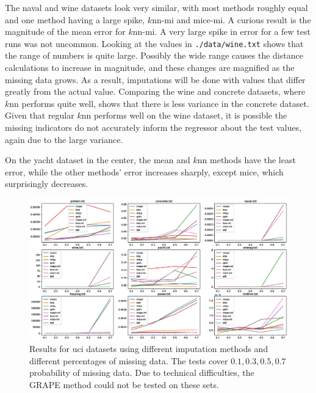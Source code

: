 \documentclass[12pt]{article}
\begin{document}
The naval and wine datasets look very similar, with most methods
roughly equal and one method having a large spike, $k$nn-mi and mice-mi.
A curious result is the magnitude of the mean error for $k$nn-mi.
A very large spike in error for a few test runs was not uncommon.
Looking at the values in \texttt{./data/wine.txt} shows that the range
of numbers is quite large.
Possibly the wide range causes the distance calculations
to increase in magnitude, and these changes are magnified as the missing 
data grows.
As a result, imputations will be done with values that differ greatly from the 
actual value.
Comparing the wine and concrete datasets, where $k$nn performs quite well,
shows that there is less variance in the concrete dataset.
Given that regular $k$nn performs well on the wine dataset, it is possible
the missing indicators do not accurately inform the regressor about the 
test values, again due to the large variance.

On the yacht dataset in the center, the mean and $k$nn methods have the least error,
while the other methods' error increases sharply, except mice, which surprisingly 
decreases.
\begin{figure}
	\centering
	\label{fig:results}
	\includegraphics[width=\linewidth]{results_std.eps}
	\caption{Results for uci datasets using different imputation methods
	and different percentages of missing data. The tests cover $0.1, 0.3, 0.5, 0.7$
	probability of missing data. Due to technical difficulties, the GRAPE
	method could not be tested on these sets.}
\end{figure}
\end{document}

